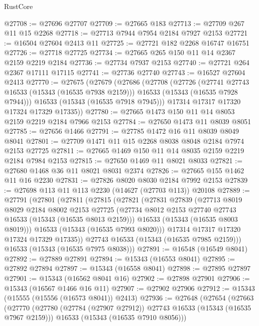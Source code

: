 \begin{lexlean}{RustCore}
\begin{coremodule}
@27708 := @27696 @27707
@27709 := @27665 @183
@27713 := @27709 @267 @11 @15 @2268
@27718 := @27713 @7944 @7954 @2184 @7927 @2153
@27721 := @16504 @27604 @2413 @11
@27725 := @27721 @182 @2268 @16747 @16751
@27726 := @27718 @27725
@27734 := @27665 @265 @150 @11 @14 @2367 @2159 @2219 @2184
@27736 := @27734 @7937 @2153
@27740 := @27721 @264 @2367 @17111 @17115
@27741 := @27736 @27740
@27743 := @16527 @27604 @2413
@27770 := @27675
    (@27679
      (@27686
        (@27708
          (@27726
            (@27741 @27743 @16533 (@15343 (@16535 @7938 @2159)))
            @16533
            (@15343 (@16535 @7928 @7944)))
          @16533
          (@15343 (@16535 @7918 @7945)))
        @17314
        @17317
        @17320
        @17324
        @17329
        @17335))
@27780 := @27665 @1473 @150 @11 @14 @8053 @2159 @2219 @2184 @7966 @2153
@27784 := @27650 @1473 @11 @8039 @8051
@27785 := @27656 @1466
@27791 := @27785 @1472 @16 @11 @8039 @8049 @8041
@27801 := @27709 @1471 @11 @15 @2268 @8038 @8048 @2184 @7974 @2153 @27725
@27811 := @27665 @1469 @150 @11 @14 @8035 @2159 @2219 @2184 @7984 @2153
@27815 := @27650 @1469 @11 @8021 @8033
@27821 := @27680 @1468 @36 @11 @8021 @8031 @2374
@27826 := @27665 @155 @1462 @11 @16 @2230
@27831 := @27826 @8020 @8030 @2184 @7992 @2153
@27839 := @27698 @113 @11 @113 @2230 (@14627 (@27703 @113)) @20108
@27889 := @27791
    (@27801
      (@27811
        (@27815
          (@27821
            (@27831
              @27839
              (@27713
                @8019
                @8029
                @2184
                @8002
                @2153
                @27725
                (@27734 @8012 @2153 @27740 @27743 @16533 (@15343 (@16535 @8013 @2159)))
                @16533
                (@15343 (@16535 @8003 @8019)))
              @16533
              (@15343 (@16535 @7993 @8020)))
            @17314
            @17317
            @17320
            @17324
            @17329
            @17335))
        @27743
        @16533
        (@15343 (@16535 @7985 @2159)))
      @16533
      (@15343 (@16535 @7975 @8038)))
@27891 := @16548 (@16549 @8041)
@27892 := @27889 @27891
@27894 := @15343 (@16553 @8041)
@27895 := @27892 @27894
@27897 := @15343 (@16558 @8041)
@27898 := @27895 @27897
@27901 := @15343 (@16562 @8041 @16)
@27902 := @27898 @27901
@27906 := @15343 (@16567 @1466 @16 @11)
@27907 := @27902 @27906
@27912 := @15343 (@15555 (@15556 (@16573 @8041)) @2413)
@27936 := @27648
    (@27654
      (@27663
        (@27770
          (@27780 (@27784 (@27907 @27912)) @27743 @16533 (@15343 (@16535 @7967 @2159)))
          @16533
          (@15343 (@16535 @7910 @8056)))

\end{coremodule}
\end{lexlean}
